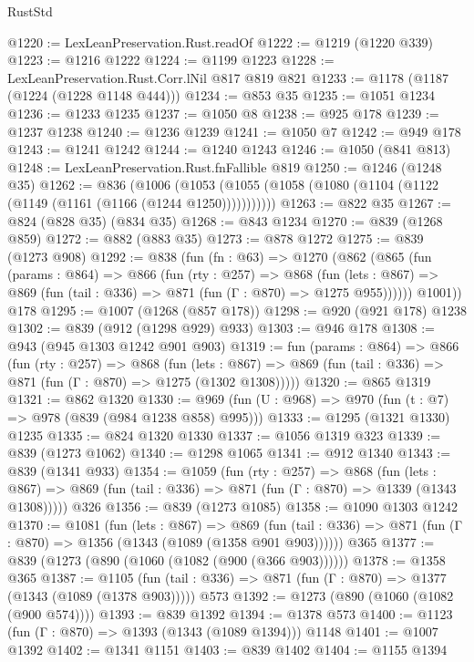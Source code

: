 \begin{lexlean}{RustStd}
\begin{coremodule}
@1220 := LexLeanPreservation.Rust.readOf
@1222 := @1219 (@1220 @339)
@1223 := @1216 @1222
@1224 := @1199 @1223
@1228 := LexLeanPreservation.Rust.Corr.lNil @817 @819 @821
@1233 := @1178 (@1187 (@1224 (@1228 @1148 @444)))
@1234 := @853 @35
@1235 := @1051 @1234
@1236 := @1233 @1235
@1237 := @1050 @8
@1238 := @925 @178
@1239 := @1237 @1238
@1240 := @1236 @1239
@1241 := @1050 @7
@1242 := @949 @178
@1243 := @1241 @1242
@1244 := @1240 @1243
@1246 := @1050 (@841 @813)
@1248 := LexLeanPreservation.Rust.fnFallible @819
@1250 := @1246 (@1248 @35)
@1262 := @836
    (@1006 (@1053 (@1055 (@1058 (@1080 (@1104 (@1122 (@1149 (@1161 (@1166 (@1244 @1250)))))))))))
@1263 := @822 @35
@1267 := @824 (@828 @35) (@834 @35)
@1268 := @843 @1234
@1270 := @839 (@1268 @859)
@1272 := @882 (@883 @35)
@1273 := @878 @1272
@1275 := @839 (@1273 @908)
@1292 := @838
    (fun (fn : @63) =>
    @1270
      (@862
        (@865
          (fun (params : @864) =>
          @866
            (fun (rty : @257) =>
            @868
              (fun (lets : @867) =>
              @869 (fun (tail : @336) => @871 (fun (Γ : @870) => @1275 @955))))))
        @1001))
    @178
@1295 := @1007 (@1268 (@857 @178))
@1298 := @920 (@921 @178) @1238
@1302 := @839 (@912 (@1298 @929) @933)
@1303 := @946 @178
@1308 := @943 (@945 @1303 @1242 @901 @903)
@1319 := fun (params : @864) =>
  @866
    (fun (rty : @257) =>
    @868
      (fun (lets : @867) =>
      @869 (fun (tail : @336) => @871 (fun (Γ : @870) => @1275 (@1302 @1308)))))
@1320 := @865 @1319
@1321 := @862 @1320
@1330 := @969 (fun (U : @968) => @970 (fun (t : @7) => @978 (@839 (@984 @1238 @858) @995)))
@1333 := @1295 (@1321 @1330) @1235
@1335 := @824 @1320 @1330
@1337 := @1056 @1319 @323
@1339 := @839 (@1273 @1062)
@1340 := @1298 @1065
@1341 := @912 @1340
@1343 := @839 (@1341 @933)
@1354 := @1059
    (fun (rty : @257) =>
    @868
      (fun (lets : @867) =>
      @869 (fun (tail : @336) => @871 (fun (Γ : @870) => @1339 (@1343 @1308)))))
    @326
@1356 := @839 (@1273 @1085)
@1358 := @1090 @1303 @1242
@1370 := @1081
    (fun (lets : @867) =>
    @869 (fun (tail : @336) => @871 (fun (Γ : @870) => @1356 (@1343 (@1089 (@1358 @901 @903))))))
    @365
@1377 := @839 (@1273 (@890 (@1060 (@1082 (@900 (@366 @903))))))
@1378 := @1358 @365
@1387 := @1105
    (fun (tail : @336) => @871 (fun (Γ : @870) => @1377 (@1343 (@1089 (@1378 @903)))))
    @573
@1392 := @1273 (@890 (@1060 (@1082 (@900 @574))))
@1393 := @839 @1392
@1394 := @1378 @573
@1400 := @1123 (fun (Γ : @870) => @1393 (@1343 (@1089 @1394))) @1148
@1401 := @1007 @1392
@1402 := @1341 @1151
@1403 := @839 @1402
@1404 := @1155 @1394

\end{coremodule}
\end{lexlean}
